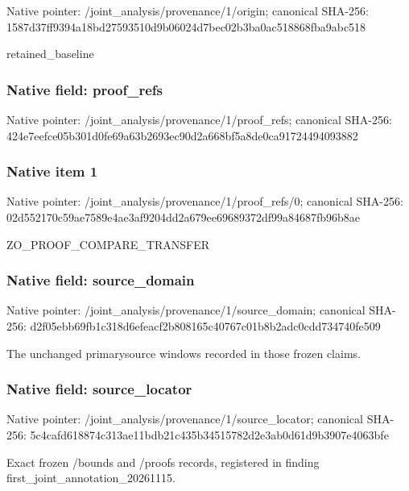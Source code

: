 \documentclass[10pt,a4paper]{article}
\begin{document}
Native pointer: /joint\_analysis/provenance/1/origin; canonical SHA-256: 1587d37ff9394a18bd275935\allowbreak{}10d9b06024d7bec02b3ba0ac\allowbreak{}518868fba9abc518


retained\_baseline


\subsubsection{Native field: proof\_refs}


Native pointer: /joint\_analysis/provenance/1/proof\_refs; canonical SHA-256: 424e7eefce05b301d0fe69a6\allowbreak{}3b2693ec90d2a668bf5a8de0\allowbreak{}ca91724494093882



\subsubsection{Native item 1}


Native pointer: /joint\_analysis/provenan\allowbreak{}ce/1/proof\_refs/0; canonical SHA-256: 02d552170c59ae7589e4ae3a\allowbreak{}f9204dd2a679ee69689372df\allowbreak{}99a84687fb96b8ae


ZO\_PROOF\_COMPARE\_TRANSFER


\subsubsection{Native field: source\_domain}


Native pointer: /joint\_analysis/provenan\allowbreak{}ce/1/source\_domain; canonical SHA-256: d2f05ebb69fb1c318d6efeac\allowbreak{}f2b808165c40767c01b8b2ad\allowbreak{}c0cdd734740fe509


The unchanged primarysource windows recorded in those frozen claims.


\subsubsection{Native field: source\_locator}


Native pointer: /joint\_analysis/provenan\allowbreak{}ce/1/source\_locator; canonical SHA-256: 5c4cafd618874c313ae11bdb\allowbreak{}21c435b34515782d2e3ab0d6\allowbreak{}1d9b3907e4063bfe


Exact frozen /bounds and /proofs records, registered in finding first\_joint\_annotation\_20261115.
\end{document}
